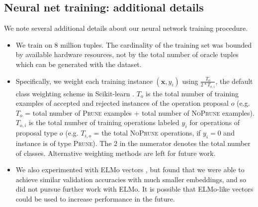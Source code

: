 \subsection{Neural net training: additional details}

We note several additional details about our neural network training procedure.

\begin{itemize}
\item{We train on 8 million tuples. The cardinality of the training set was bounded by available hardware resources, not by the total number of oracle tuples which can be generated with the \citet{filippova2013overcoming} dataset.}
\item{Specifically, we weight each training instance $(\bm{x}, y_i)$ using $\frac{T_o}{2 * T_{o,i}}$, the default class weighting scheme in Scikit-learn \cite{Pedregosa:2011:SML:1953048.2078195}. $T_o$ is the total number of training examples of accepted and rejected instances of the operation proposal $o$ (e.g. $T_o$ = total number of \textsc{Prune} examples + total number of \textsc{NoPrune} examples). $T_{o,i}$ is the total number of training operations labeled $y_i$ for operations of proposal type $o$ (e.g. $T_{i,o}$ = the total \textsc{NoPrune} operations, if $y_i=0$ and instance is of type \textsc{Prune}). The 2 in the numerator denotes the total number of classes. Alternative weighting methods are left for future work.}
\item{We also experimented with ELMo vectors \cite{Peters:2018}, but found that we were able to achieve similar validation accuracies with much smaller embeddings, and so did not pursue further work with ELMo. It is possible that ELMo-like vectors could be used to increase performance in the future.}
\end{itemize}
